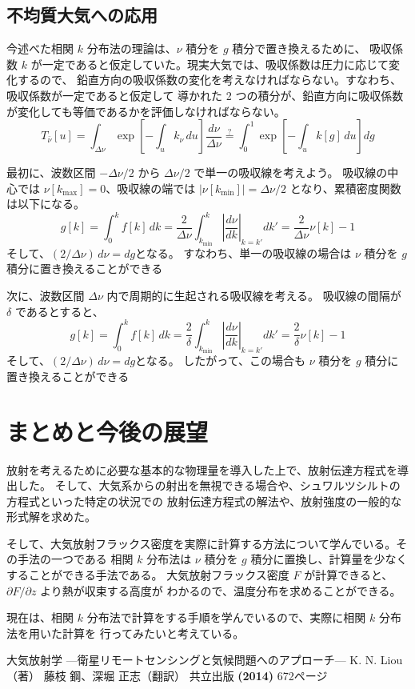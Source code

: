 \documentclass[article]{dennou777}
\begin{document}
\subsection{不均質大気への応用}
今述べた相関 $k$ 分布法の理論は、$\nu$ 積分を $g$ 積分で置き換えるために、
吸収係数 $k$ が一定であると仮定していた。現実大気では、吸収係数は圧力に応じて変化するので、
鉛直方向の吸収係数の変化を考えなければならない。すなわち、吸収係数が一定であると仮定して
導かれた 2 つの積分が、鉛直方向に吸収係数が変化しても等価であるかを評価しなければならない。
\begin{equation}
	T_{\bar\nu}[u]
	=\int_{\Delta\nu}\exp\left[-\int_u k_\nu\,du\right]\frac{d\nu}{\Delta\nu}
	\stackrel{?}{=}\int^1_0\exp\left[-\int_uk[g]\,du\right]dg
\end{equation}

最初に、波数区間 $-\Delta\nu/2$ から $\Delta\nu/2$ で単一の吸収線を考えよう。
吸収線の中心では $\nu[k_{\mathrm{max}}]=0$、吸収線の端では
$|\nu[k_{\mathrm{min}}]|=\Delta\nu/2$ となり、累積密度関数は以下になる。
\begin{equation}
	g[k]=\int^k_0 f[k]\,dk
	=\frac{2}{\Delta\nu}\int^k_{k_{\mathrm{min}}}\left|\frac{d\nu}{dk}\right|_{k=k'}dk'
	=\frac{2}{\Delta\nu}\nu[k]-1
\end{equation}
そして、$(2/\Delta\nu)\,d\nu=dg$となる。
すなわち、単一の吸収線の場合は $\nu$ 積分を $g$ 積分に置き換えることができる

次に、波数区間 $\Delta\nu$ 内で周期的に生起される吸収線を考える。
吸収線の間隔が $\delta$ であるとすると、
\begin{equation}
	g[k]=\int^k_0 f[k]\,dk
	=\frac{2}{\delta}\int^k_{k_{\mathrm{min}}}\left|\frac{d\nu}{dk}\right|_{k=k'}dk'
	=\frac{2}{\delta}\nu[k]-1
\end{equation}
そして、$(2/\Delta\nu)\,d\nu=dg$となる。
したがって、この場合も $\nu$ 積分を $g$ 積分に置き換えることができる

\section{まとめと今後の展望}

放射を考えるために必要な基本的な物理量を導入した上で、放射伝達方程式を導出した。
そして、大気系からの射出を無視できる場合や、シュワルツシルトの方程式といった特定の状況での
放射伝達方程式の解法や、放射強度の一般的な形式解を求めた。

そして、大気放射フラックス密度を実際に計算する方法について学んでいる。その手法の一つである
相関 $k$ 分布法は $\nu$ 積分を $g$ 積分に置換し、計算量を少なくすることができる手法である。
大気放射フラックス密度 $F$ が計算できると、$\partial F/\partial z$ より熱が収束する高度が
わかるので、温度分布を求めることができる。

現在は、相関 $k$ 分布法で計算をする手順を学んでいるので、実際に相関 $k$ 分布法を用いた計算を
行ってみたいと考えている。

\begin{thebibliography}{9}
	 大気放射学 ---衛星リモートセンシングと気候問題へのアプローチ---
		K. N. Liou（著） 藤枝 鋼、深堀 正志（翻訳）
		共立出版 \textbf{(2014)} 672ページ
\end{thebibliography}
\end{document}
